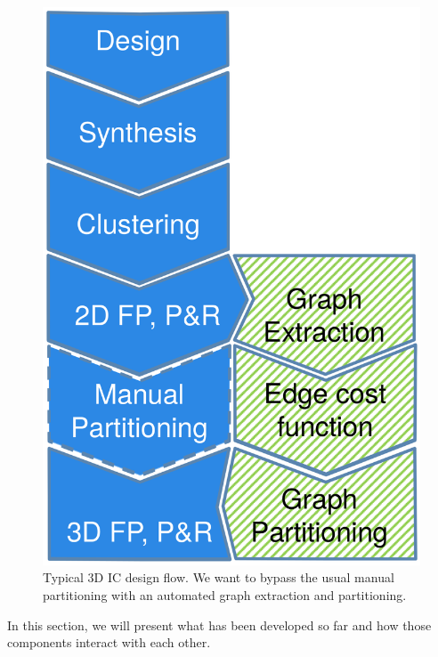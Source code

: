 \documentclass[11pt,a4paper]{report} %
\theoremstyle{customdef}
\begin{document}
\begin{figure}[!h]
	\centering
	\includegraphics[width=.35\textwidth]{img/flow.png}
	\caption{Typical 3D IC design flow. We want to bypass the usual manual partitioning with an automated graph extraction and partitioning.}
	\label{fig:flow}
\end{figure}

In this section, we will present what has been developed so far and how those components interact with each other.

\end{document}
